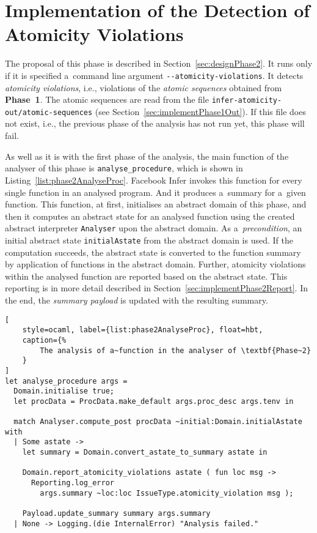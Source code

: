 \section{Implementation of the Detection of Atomicity Violations}
\label{sec:implementPhase2}

The proposal of this phase is described in Section~\ref{sec:designPhase2}.
It runs only if it is specified a~command line argument
\texttt{{-}{-}atomicity-violations}. It detects \emph{atomicity violations},
i.e., violations of the \emph{atomic sequences} obtained from \textbf{Phase~1}.
The atomic sequences are read from the file
\texttt{infer-atomicity-out/atomic-sequences} (see
Section~\ref{sec:implementPhase1Out}). If this file does not exist,
i.e., the previous phase of the analysis has not run yet, this phase will
fail.

As well as it is with the first phase of the analysis, the main function
of the analyser of this phase is \texttt{analyse\_procedure}, which is shown
in Listing~\ref{list:phase2AnalyseProc}. Facebook Infer invokes this
function for every single function in an analysed program. And it produces
a~summary for a~given function. This function, at first, initialises an
abstract domain of this phase, and then it computes an abstract state
for an analysed function using the created abstract interpreter
\texttt{Analyser} upon the abstract domain. As a~\emph{precondition},
an initial abstract state \texttt{initialAstate} from the abstract domain
is used. If the computation succeeds, the abstract state is converted
to the function summary by application of functions in the abstract
domain. Further, atomicity violations within the analysed function
are reported based on the abstract state. This reporting is in more
detail described in Section~\ref{sec:implementPhase2Report}. In the end,
the \emph{summary payload} is updated with the resulting summary.

\begin{lstlisting}[
    style=ocaml, label={list:phase2AnalyseProc}, float=hbt,
    caption={%
        The analysis of a~function in the analyser of \textbf{Phase~2}
    }
]
let analyse_procedure args =
  Domain.initialise true;
  let procData = ProcData.make_default args.proc_desc args.tenv in

  match Analyser.compute_post procData ~initial:Domain.initialAstate with
  | Some astate ->
    let summary = Domain.convert_astate_to_summary astate in

    Domain.report_atomicity_violations astate ( fun loc msg ->
      Reporting.log_error
        args.summary ~loc:loc IssueType.atomicity_violation msg );

    Payload.update_summary summary args.summary
  | None -> Logging.(die InternalError) "Analysis failed."
\end{lstlisting}

